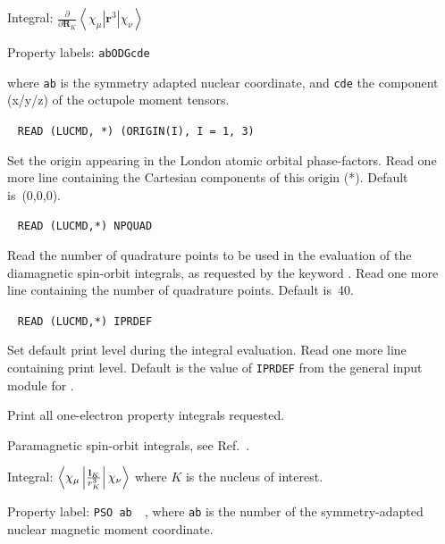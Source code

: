 \begin{description}
\begin{list}{}{}
\item Integral: $\frac{\partial}{\partial {\mathbf
R}_K}\left<\chi_{\mu}\left|{\mathbf r}^3\right|\chi_{\nu}\right>$ 
\item Property labels: \verb|abODGcde|
\end{list}
where \verb|ab| is the symmetry adapted nuclear coordinate, and \verb|cde| the
component (x/y/z) of the octupole moment tensors.


\item[\Key{PHASEO}]\verb| |\newline
\verb|READ (LUCMD, *) (ORIGIN(I), I = 1, 3)|

Set the origin appearing in the London atomic orbital phase-factors.
Read one more line containing the Cartesian components of this origin (*).
Default is~(0,0,0).

\item[\Key{POINTS}]\verb| |\newline
\verb|READ (LUCMD,*) NPQUAD|

Read the number of quadrature points to be
used in the evaluation of
the diamagnetic spin-orbit integrals, as
requested by the keyword
. Read one more line containing the number of quadrature
points. Default is~40.

\item[\Key{PRINT}]\verb| |\newline
\verb|READ (LUCMD,*) IPRDEF|

Set default print level during the integral evaluation.  Read one more line
containing print level. Default is the value of \verb|IPRDEF|
from the general input module for {\dalton}.

\item[\Key{PROPRI}] Print all one-electron property integrals requested.

\item[\Key{PSO}] Paramagnetic spin-orbit integrals, see
Ref.~\cite{ovhapjhjajsbpthjcp96}.

\begin{list}{}{}
\item Integral:
$\left<\chi_{\mu}\left|\frac{{\bf l}_K}{r_{K}^{3}}\right|\chi_{\nu}\right>$
where $K$ is the nucleus of interest.
\item Property label: \verb|PSO ab  |, where \verb|ab| is the number
of the symmetry-adapted nuclear magnetic moment coordinate.
\end{list}


\end{description}
